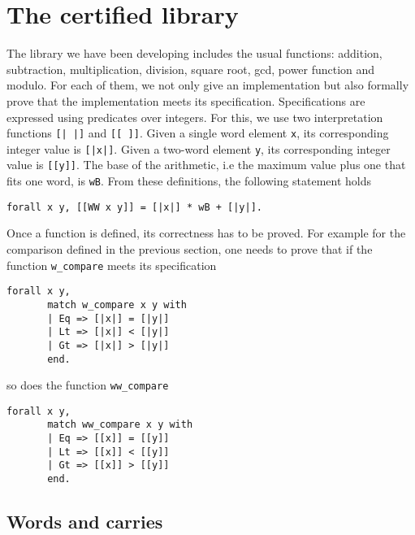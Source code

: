 \section{The certified library \label{Op}}
The library we have been developing includes the usual functions:
addition, subtraction, multiplication,  division, square root, gcd, power function
and modulo. 
For each of them, we not only give an implementation but also formally prove 
that the implementation meets its specification. Specifications are expressed 
using predicates over integers. For this, we use two interpretation functions
{\tt [|\ |]} and {\tt [[\ ]]}.
Given a single word element {\tt x}, its corresponding integer value
is {\tt [|x|]}. Given a two-word element {\tt y}, its corresponding
integer value is {\tt [[y]]}. The base of the arithmetic, i.e
the maximum value plus one that fits  one word, is {\tt wB}. From these definitions, the 
following statement holds
\begin{verbatim}
forall x y, [[WW x y]] = [|x|] * wB + [|y|].
\end{verbatim}
Once a function is defined, its correctness has to be proved.
For example for the comparison defined in the previous section,
one needs to prove that if the function {\tt w\_compare} meets its specification
\begin{verbatim}
forall x y,
       match w_compare x y with
       | Eq => [|x|] = [|y|]
       | Lt => [|x|] < [|y|]
       | Gt => [|x|] > [|y|]
       end.
\end{verbatim}
so does the function {\tt ww\_compare}
\begin{verbatim}
forall x y,
       match ww_compare x y with
       | Eq => [[x]] = [[y]]
       | Lt => [[x]] < [[y]]
       | Gt => [[x]] > [[y]]
       end.
\end{verbatim}

\subsection{Words and carries}

